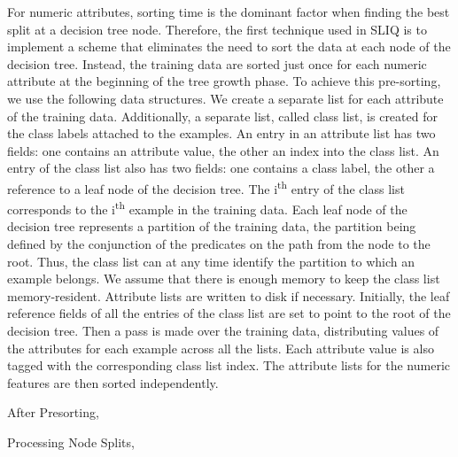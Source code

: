 \documentclass[12pt]{article}
\renewcommand{\_}{\kern-1.5pt\textunderscore\kern-1.5pt}
\begin{document}
\begin{enumerate}
For numeric attributes, sorting time is the dominant factor when finding the best split at a decision tree node. Therefore, the first technique used in SLIQ is to implement a scheme that eliminates the need to sort the data at each node of the decision tree. Instead, the training data are sorted just once for each numeric attribute at the beginning of the tree growth phase. To achieve this pre-sorting, we use the following data structures. We create a separate list for each attribute of the training data. Additionally, a separate list, called class list, is created for the class labels attached to the examples. An entry in an attribute list has two fields: one contains an attribute value, the other an index into the class list. An entry of the class list also has two fields: one contains a class label, the other a reference to a leaf node of the decision tree. The i\textsuperscript{th} entry of the class list corresponds to the i\textsuperscript{th} example in the training data. Each leaf node of the decision tree represents a partition of the training data, the partition being defined by the conjunction of the predicates on the path from the node to the root. Thus, the class list can at any time identify the partition to which an example belongs. We assume that there is enough memory to keep the class list memory-resident. Attribute lists are written to disk if necessary. Initially, the leaf reference fields of all the entries of the class list are set to point to the root of the decision tree. Then a pass is made over the training data, distributing values of the attributes for each example across all the lists. Each attribute value is also tagged with the corresponding class list index. The attribute lists for the numeric features are then sorted independently.\par

After Presorting, \par

\par

Processing Node Splits, \par


\end{enumerate}
\end{document}
